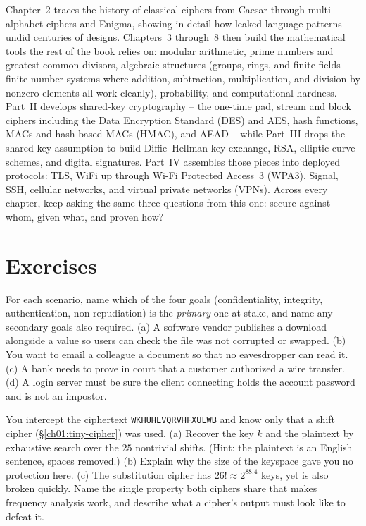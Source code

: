 Chapter~2 traces the history of classical ciphers from Caesar through multi-alphabet ciphers and Enigma, showing in detail how leaked language patterns undid centuries of designs. Chapters~3 through~8 then build the mathematical tools the rest of the book relies on: modular arithmetic, prime numbers and greatest common divisors, algebraic structures (groups, rings, and finite fields -- finite number systems where addition, subtraction, multiplication, and division by nonzero elements all work cleanly), probability, and computational hardness. Part~II develops shared-key cryptography -- the one-time pad, stream and block ciphers including the Data Encryption Standard (DES) and AES, hash functions, MACs and hash-based MACs (HMAC), and AEAD -- while Part~III drops the shared-key assumption to build Diffie--Hellman key exchange, RSA, elliptic-curve schemes, and digital signatures. Part~IV assembles those pieces into deployed protocols: TLS, WiFi up through Wi-Fi Protected Access~3 (WPA3), Signal, SSH, cellular networks, and virtual private networks (VPNs). Across every chapter, keep asking the same three questions from this one: secure against whom, given what, and proven how?

\section{Exercises}
\label{ch01:exercises}

\begin{exercise}
For each scenario, name which of the four goals (confidentiality, integrity, authentication, non-repudiation) is the \emph{primary} one at stake, and name any secondary goals also required.
(a) A software vendor publishes a download alongside a value so users can check the file was not corrupted or swapped.
(b) You want to email a colleague a document so that no eavesdropper can read it.
(c) A bank needs to prove in court that a customer authorized a wire transfer.
(d) A login server must be sure the client connecting holds the account password and is not an impostor.
\end{exercise}

\begin{exercise}
You intercept the ciphertext \texttt{WKHUHLVQRVHFXULWB} and know only that a shift cipher (\S\ref{ch01:tiny-cipher}) was used.
(a) Recover the key $k$ and the plaintext by exhaustive search over the $25$ nontrivial shifts. (Hint: the plaintext is an English sentence, spaces removed.)
(b) Explain why the size of the keyspace gave you no protection here.
(c) The substitution cipher has $26! \approx 2^{88.4}$ keys, yet is also broken quickly. Name the single property both ciphers share that makes frequency analysis work, and describe what a cipher's output must look like to defeat it.
\end{exercise}

